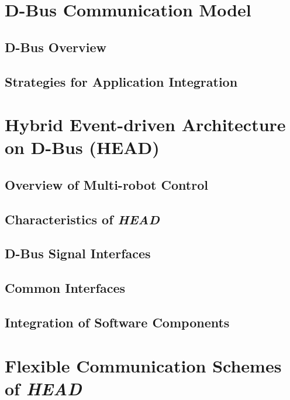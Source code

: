 \documentclass{ifacconf}
\begin{document}
\section{D-Bus Communication Model}
\subsection{D-Bus Overview}



\subsection{Strategies for Application Integration}

\section{Hybrid Event-driven Architecture on D-Bus (HEAD)}
\subsection{Overview of Multi-robot Control} 

\subsection{Characteristics of {\em HEAD}}


\subsection{D-Bus Signal Interfaces}

\subsection{Common Interfaces}


\subsection{Integration of Software Components}

\section{Flexible Communication  Schemes of {\em HEAD}}
\end{document}
